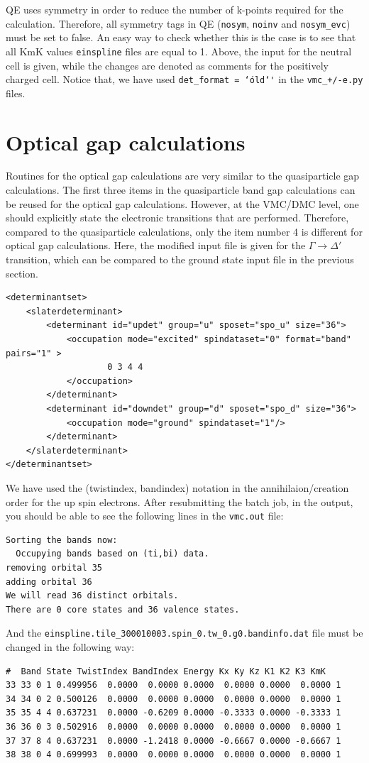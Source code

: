 QE uses symmetry in order to reduce the number of k-points required for the calculation. 
Therefore, all symmetry tags in QE (\texttt{nosym}, \texttt{noinv} and \texttt{nosym\_evc}) must be set to false. 
An easy way to check whether this is the case is to see that all KmK values \texttt{einspline} files are equal to 1. 
Above, the input for the neutral cell is given, while the changes are denoted as comments for the positively charged cell. 
Notice that, we have used \texttt{det\_format      = \char`\'old\char`\'} in the \texttt{vmc\_+/-e.py} files.
\section{Optical gap calculations}
Routines for the optical gap calculations are very similar to the quasiparticle gap calculations. 
The first three items in the quasiparticle band gap calculations can be reused for the optical gap calculations. 
However, at the VMC/DMC level, one should explicitly state the electronic transitions that are performed. 
Therefore, compared to the quasiparticle calculations, only the item number 4 is different for optical gap calculations. 
Here, the modified input file is given for the $\Gamma\rightarrow\Delta'$ transition, which can be compared to the ground state input file in the previous section. 
\begin{lstlisting}
<determinantset>
	<slaterdeterminant>
		<determinant id="updet" group="u" sposet="spo_u" size="36">
		    <occupation mode="excited" spindataset="0" format="band" pairs="1" >
					0 3 4 4
		    </occupation>
		</determinant>
		<determinant id="downdet" group="d" sposet="spo_d" size="36">
		    <occupation mode="ground" spindataset="1"/>	
		</determinant>
	</slaterdeterminant>
</determinantset>
\end{lstlisting}
We have used the (twistindex, bandindex) notation in the annihilaion/creation order for the up spin electrons.
After resubmitting the batch job, in the output, you should be able to see the following lines in the \texttt{vmc.out} file:
\begin{lstlisting}
Sorting the bands now:
  Occupying bands based on (ti,bi) data.
removing orbital 35
adding orbital 36
We will read 36 distinct orbitals.
There are 0 core states and 36 valence states.
\end{lstlisting}
And the \texttt{einspline.tile\_300010003.spin\_0.tw\_0.g0.bandinfo.dat} file must be changed in the following way: 
\begin{lstlisting}
#  Band State TwistIndex BandIndex Energy Kx Ky Kz K1 K2 K3 KmK
33 33 0	1 0.499956	0.0000  0.0000 0.0000  0.0000 0.0000  0.0000 1
34 34 0	2 0.500126	0.0000  0.0000 0.0000  0.0000 0.0000  0.0000 1
35 35 4	4 0.637231	0.0000 -0.6209 0.0000 -0.3333 0.0000 -0.3333 1
36 36 0	3 0.502916	0.0000  0.0000 0.0000  0.0000 0.0000  0.0000 1
37 37 8	4 0.637231	0.0000 -1.2418 0.0000 -0.6667 0.0000 -0.6667 1
38 38 0	4 0.699993	0.0000  0.0000 0.0000  0.0000 0.0000  0.0000 1
\end{lstlisting}
